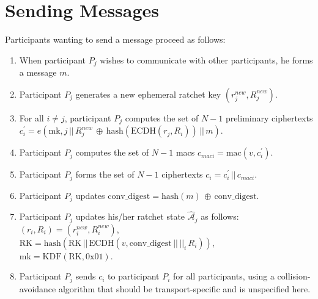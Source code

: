 \documentclass[%
preprint,
amsmath,amssymb,
aps,
prb,
floatfix,
]{revtex4-1}
\begin{document}
\section{\label{sec:sending}Sending Messages}
Participants wanting to send a message proceed as follows:
\begin{enumerate}
\item When participant $P_j$ wishes to communicate with other
participants, he forms a message $m$.
\item Participant $P_j$ generates a new ephemeral ratchet key
$(r_j^{new},R_j^{new})$.
\item For all $i \ne j$, participant $P_j$ computes the set of $N-1$ preliminary
ciphertexts $c_{i}^\prime = e(\mathrm{mk}, j
\, || \, R_j^{new} \, \oplus \, \mathrm{hash}(\mathrm{ECDH}(r_j, R_i)) \, || \, m)$.
\item Participant $P_j$ computes the set of $N-1$ macs $c_{maci} =
\mathrm{mac}(v, c_i^\prime)$.
\item Participant $P_j$ forms the set of $N-1$ ciphertexts $c_i = c_i^\prime \, || \, c_{maci}$.
\item Participant $P_j$ updates $\mathrm{conv\_digest} = \mathrm{hash}(m) \, \oplus \, \mathrm{conv\_digest}$.
\item Participant $P_j$ updates his/her ratchet state $\mathcal{\hat{A}}_j$ as
follows:\\
$(r_i, R_i) = (r_i^{new}, R_i^{new})$, \\
$\mathrm{RK} = \mathrm{hash}(\mathrm{RK} \, || \, \mathrm{ECDH}(v,
\mathrm{conv\_digest} \, || \, ||_i \, R_i))$, \\
$\mathrm{mk} = \mathrm{KDF}(\mathrm{RK}, 0\mathrm{x}01)$.
\item Participant $P_j$ sends $c_i $ to participant $P_i$ for all participants,
using a collision-avoidance algorithm that should be transport-specific and is
unspecified here.
\end{enumerate}
\end{document}
